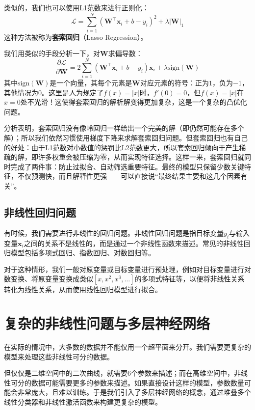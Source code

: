 类似的，我们也可以使用L1范数来进行正则化：
\[ \mathcal{L} = \sum_{i=1}^{N} (\mathbf{W}^\top \mathbf{x}_i + b - y_i)^2 + \lambda \left|\mathbf{W}\right|_1 \]
这种方法被称为\textbf{套索回归}（Lasso Regression）。

我们用类似的手段分析一下，对$\mathbf{W}$求偏导数：
\[ \frac{\partial \mathcal{L}}{\partial \mathbf{W}} = 2 \sum_{i=1}^{N} (\mathbf{W}^\top \mathbf{x}_i + b - y_i) \mathbf{x}_i + \lambda \text{sign}(\mathbf{W}) \]
其中$\text{sign}(\mathbf{W})$是一个向量，其每个元素是$\mathbf{W}$对应元素的符号：正为$1$，负为$-1$，其他情况为$0$。这里是人为规定了$f(x) = |x|$时，$f'(0) = 0$，但$f(x)=|x|$在$x=0$处不光滑！这使得套索回归的解析解变得更加复杂，这是一个复杂的凸优化问题。

分析表明，套索回归没有像岭回归一样给出一个完美的解（即仍然可能存在多个解）；所以我们依然习惯使用梯度下降来求解套索回归问题。但套索回归也有自己的好处：由于L1范数对小数值的惩罚比L2范数更大，所以套索回归倾向于产生稀疏的解，即许多权重会被压缩为零，从而实现特征选择。这样一来，套索回归就同时完成了两件事：防止过拟合、自动筛选重要特征。最终的模型只保留少数关键特征，不仅预测快，而且解释性更强——可以直接说“最终结果主要和这几个因素有关”。

\subsection{非线性回归问题}

有时候，我们需要进行非线性的回归问题。非线性回归问题是指目标变量$y_i$与输入变量$\mathbf{x}_i$之间的关系不是线性的，而是通过一个非线性函数来描述。常见的非线性回归模型包括多项式回归、指数回归、对数回归等。

对于这种情形，我们一般对原变量或目标变量进行预处理，例如对目标变量进行对数变换、将原变量变换成类似$[x, x^2, x^3, \ldots]$的多项式特征等，以便将非线性关系转化为线性关系，从而使用线性回归模型进行拟合。

\section{复杂的非线性问题与多层神经网络}

在实际的情况中，大多数的数据并不能仅用一个超平面来分开。我们需要更复杂的模型来处理这些非线性可分的数据。

但仅仅是二维空间中的二次曲线，就需要6个参数来描述；而在高维空间中，非线性可分的数据可能需要更多的参数来描述。如果直接设计这样的模型，参数数量可能会非常庞大，且难以训练。于是我们引入了多层神经网络的概念，通过堆叠多个线性分类器和非线性激活函数来构建更复杂的模型。

